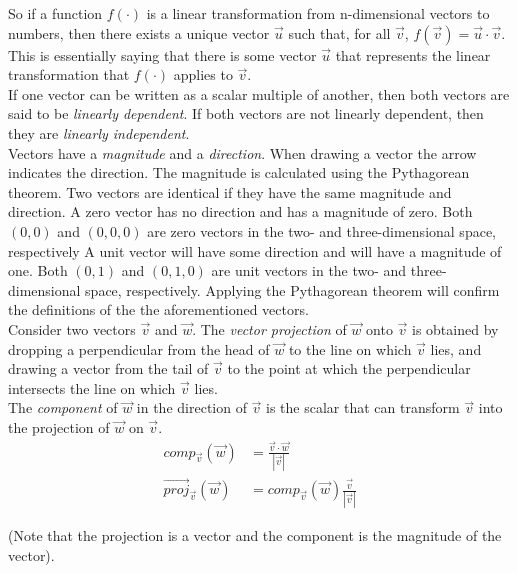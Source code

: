 \documentclass[12pt]{article}
\begin{document}
So if a function $f(\cdot)$ is a linear transformation from n-dimensional vectors to numbers, then there exists a unique vector $\vec{u}$ such that, for all $\vec{v}$, $f(\vec{v}) = \vec{u}\cdot\vec{v}$.  \\

 This is essentially saying that there is some vector $\vec{u}$ that represents the linear transformation that $f(\cdot)$ applies to $\vec{v}$. \\

 If one vector can be written as a scalar multiple of another, then both vectors are said to be \emph{linearly dependent}. If both vectors are not linearly dependent, then they are \emph{linearly independent}.\\

 Vectors have a \emph{magnitude} and a \emph{direction}. When drawing a vector the arrow indicates the direction. The magnitude is calculated using the Pythagorean theorem. Two vectors are identical if they have the same magnitude and direction. A zero vector has no direction and has a magnitude of zero. Both $(0,0)$ and $(0,0,0)$ are zero vectors in the two- and three-dimensional space, respectively A unit vector will have some direction and will have a magnitude of one. Both $(0,1)$ and $(0,1,0)$ are unit vectors in the two- and three- dimensional space, respectively. Applying the Pythagorean theorem will confirm the definitions of the the aforementioned vectors.  \\

 Consider two vectors $\vec{v}$ and $\vec{w}$. The \emph{vector projection} of $\vec{w}$ onto $\vec{v}$ is obtained by dropping a perpendicular from the head of $\vec{w}$ to the line on which $\vec{v}$ lies, and drawing a vector from the tail of $\vec{v}$ to the point at which the perpendicular intersects the line on which $\vec{v}$ lies. \\

 The \emph{component} of $\vec{w}$ in the direction of $\vec{v}$ is the scalar that can transform $\vec{v}$ into the projection of $\vec{w}$ on $\vec{v}$. 
\begin{align*}
comp_{\vec{v}}(\vec{w}) &= \frac{\vec{v}\cdot\vec{w}}{|\vec{v}|} \\
\vec{proj}_{\vec{v}}(\vec{w}) &= comp_{\vec{v}}(\vec{w})\frac{\vec{v}}{|\vec{v}|}
\end{align*}

 (Note that the projection is a vector and the component is the magnitude of the vector).\\
\end{document}

